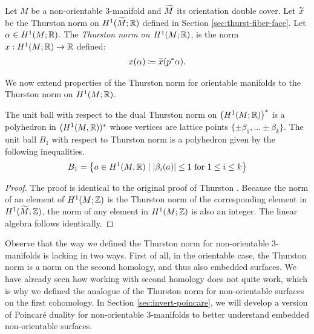 Let $M$ be a non-orientable 3-manifold and $\widetilde{M}$ its orientation double cover.  Let $\widetilde{x}$ be the Thurston norm on $H^1(\widetilde{M};\mathbb{R})$ defined in Section \ref{sec:thurst-fiber-face}.
  Let $\alpha\in H^1(M;\mathbb{R}).$ 
  The {\it Thurston norm on $H^1(M; \mathbb{R})$}, is the norm $x: H^1(M;\mathbb{R})\rightarrow \mathbb{R}$ defined:
  \begin{align*}
    x(\alpha) \coloneqq \widetilde{x}(p^{\ast}\alpha).
  \end{align*}

We now extend properties of the Thurston norm for orientable manifolds to the Thurston norm on $H^1(M;\mathbb{R})$.
\begin{thm}
  The unit ball with respect to the dual Thurston norm on $\left( H^1(M; \mathbb{R}) \right)^{\ast}$ is a polyhedron in $(H^1(M,\mathbb{R}))^\ast$
  whose vertices are lattice points $\{\pm \beta_1, \ldots \pm \beta_k\}$. The unit ball $B_1$ with respect to
  Thurston norm is a polyhedron given by the following inequalities.
  \begin{align*}
    B_1 = \left\{ a\in H^1(M,\mathbb{R}) \mid \left| \beta_i(a) \right| \leq 1 \text{ for $1\leq i \leq k$} \right\}
  \end{align*}
\end{thm}

\begin{proof}
  The proof is identical to the original proof of Thurston
  \cite[Theorem 2]{thurston1986norm}. Because the norm of an element of
  $H^1(M; \mathbb{Z})$ is the Thurston norm of the corresponding element in $H^1(\widetilde{M}; \mathbb{Z})$, the norm of any element in
  $H^1(M; \mathbb{Z})$ is also an integer.  The linear algebra follows identically.
\end{proof}

Observe that the way we defined the Thurston norm for non-orientable $3$-manifolds is lacking in two
ways. First of all, in the orientable case, the Thurston norm is a norm on the second homology, and thus also
embedded surfaces. We have already seen how working with second homology does not quite work, which is why we defined the analogue of the Thurston norm for non-orientable surfaces on the
first cohomology. %
In Section \ref{sec:invert-poincare}, we will develop a version of Poincar\'e duality for non-orientable 3-manifolds to better understand embedded non-orientable surfaces.

